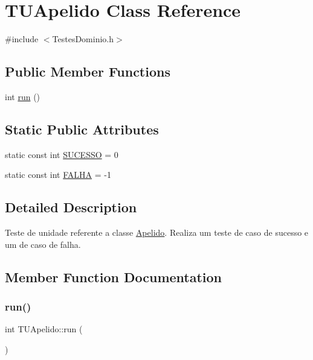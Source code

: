 \hypertarget{class_t_u_apelido}{}\section{T\+U\+Apelido Class Reference}
\label{class_t_u_apelido}


{\ttfamily \#include $<$Testes\+Dominio.\+h$>$}

\subsection*{Public Member Functions}
\begin{DoxyCompactItemize}
\item 
int \hyperlink{class_t_u_apelido_ab5aabaa60fd00030d047ef8bf6c55fec}{run} ()
\end{DoxyCompactItemize}
\subsection*{Static Public Attributes}
\begin{DoxyCompactItemize}
\item 
static const int \hyperlink{class_t_u_apelido_aa100f19a4867e7bf07c49161bb2efef0}{S\+U\+C\+E\+S\+SO} = 0
\item 
static const int \hyperlink{class_t_u_apelido_afdc614cde9b44f65a445dbaf41142698}{F\+A\+L\+HA} = -\/1
\end{DoxyCompactItemize}


\subsection{Detailed Description}
Teste de unidade referente a classe \hyperlink{class_apelido}{Apelido}. Realiza um teste de caso de sucesso e um de caso de falha. 

\subsection{Member Function Documentation}
\mbox{\label{class_t_u_apelido_ab5aabaa60fd00030d047ef8bf6c55fec}} 
\subsubsection{\texorpdfstring{run()}{run()}}
{\footnotesize\ttfamily int T\+U\+Apelido\+::run (\begin{DoxyParamCaption}{ }\end{DoxyParamCaption})}



